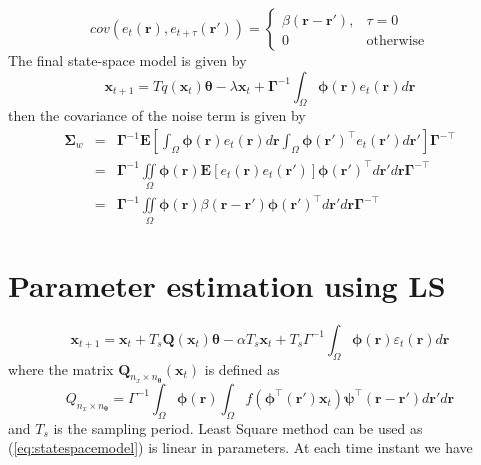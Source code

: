 \documentclass[onecolumn,draftcls]{IEEEtran}
\begin{document}
\begin{equation}
cov(e_t(\mathbf{r}),e_{t+\tau}(\mathbf{r'}))=
\begin{cases}
\beta\left(\mathbf{r}-\mathbf{r'}\right), & \tau=0 \\
0 & \mathrm{otherwise}
\end{cases}
\label{eq:FieldCovariance}
\end{equation}
The final state-space model is given by
\begin{equation}
\mathbf{x}_{t + 1} = T q(\mathbf{x}_t)\boldsymbol{\theta} -\lambda \mathbf{x}_t + \boldsymbol{\Gamma}^{-1}\int_\Omega  {\boldsymbol{\phi} ( \mathbf{r} )e_t( \mathbf{r} )d\mathbf{r}}
\end{equation}
then the covariance of the noise term is given by
\begin{eqnarray}
\mathbf{\Sigma}_w&=&\mathbf{\Gamma}^{-1}\mathbf E[\int_{\Omega}\boldsymbol{\phi}\left(\mathbf{r}\right)e_t\left(\mathbf{r}\right)d\mathbf{r} \int_{\Omega}\boldsymbol{\phi}\left(\mathbf{r}'\right)^{\top} e_t\left(\mathbf{r}'\right)d\mathbf{r}']\mathbf{\Gamma}^{- \top} \nonumber \\
&=&\mathbf{\Gamma}^{-1}\iint\limits_{\Omega} \boldsymbol{\phi}\left(\mathbf{r}\right) \mathbf E[e_t\left(\mathbf{r}\right)e_t\left(\mathbf{r}'\right)]\boldsymbol{\phi}\left(\mathbf{r}'\right)^{\top}d\mathbf{r}' d\mathbf r\mathbf{\Gamma}^{- \top} \nonumber\\
&=&\mathbf{\Gamma}^{-1}\iint\limits_{\Omega}\boldsymbol{\phi}\left(\mathbf r\right) \beta\left(\mathbf r- \mathbf r' \right)\boldsymbol{\phi}\left(\mathbf r'\right)^{\top}d\mathbf r' d\mathbf r\mathbf{\Gamma}^{- \top} 
\end{eqnarray}

\section{Parameter estimation using LS}
\begin{equation}
 \mathbf x_{t+1}=\mathbf{x}_{t}+T_s \mathbf{Q}(\mathbf{x}_t)\boldsymbol{\theta}-\alpha T_s\mathbf{x}_t+T_s\Gamma^{-1}\int_\Omega\boldsymbol{\phi}(\mathbf r)\varepsilon_t(\mathbf r)d\mathbf r
\label{eq:statespacemodel}
\end{equation}
where the matrix $\mathbf Q_{n_x \times n_{\boldsymbol{\theta}}}(\mathbf x_t)$ is defined as
\begin{equation}
 Q_{n_x \times n_{\boldsymbol{\theta}}}=\Gamma^{-1}\int_\Omega\boldsymbol{\phi}(\mathbf r)\int_\Omega f(\boldsymbol{\phi}^\top(\mathbf r')\mathbf x_t)\mathbf{\psi}^\top(\mathbf r-\mathbf r')d\mathbf r'd\mathbf r
\end{equation}
and $T_s$ is the sampling period. Least Square method can be used as (\ref{eq:statespacemodel}) is linear in parameters. At each time instant we have
\end{document}
